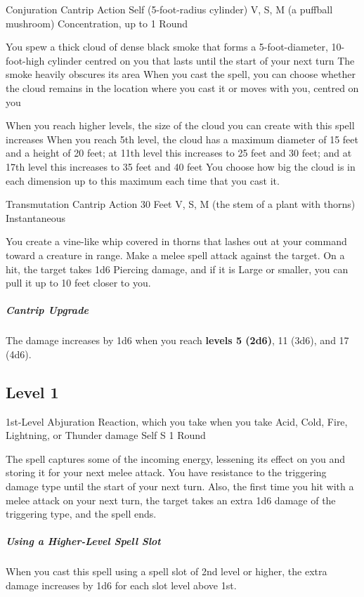 \documentclass[letterpaper,openany,oneside,twocolumn]{book}
\begin{document}
	{Conjuration Cantrip}
	{Action}
	{Self (5-foot-radius cylinder)}
	{V, S, M (a puffball mushroom)}
	{Concentration, up to 1 Round}

You spew a thick cloud of dense black smoke that forms a 5-foot-diameter, 10-foot-high cylinder centred on you that lasts until the start of your next turn The smoke heavily obscures its area When you cast the spell, you can choose whether the cloud remains in the location where you cast it or moves with you, centred on you

When you reach higher levels, the size of the cloud you can create with this spell increases When you reach 5th level, the cloud has a maximum diameter of 15 feet and a height of 20 feet; at 11th level this increases to 25 feet and 30 feet; and at 17th level this increases to 35 feet and 40 feet You choose how big the cloud is in each dimension up to this maximum each time that you cast it.

	{Transmutation Cantrip}
	{Action}
	{30 Feet}
	{V, S, M (the stem of a plant with thorns)}
	{Instantaneous}

You create a vine-like whip covered in thorns that lashes out at your command toward a creature in range. Make a melee spell attack against the target. On a hit, the target takes 1d6 Piercing damage, and if it is Large or smaller, you can pull it up to 10 feet closer to you.

\subparagraph*{Cantrip Upgrade} The damage increases by 1d6 when you reach \textbf{levels 5 (2d6)}, 11 (3d6), and 17 (4d6).

\subsection*{Level 1}

	{1st-Level Abjuration}
	{Reaction, which you take when you take Acid, Cold, Fire, Lightning, or Thunder damage}
	{Self}
	{S}
	{1 Round}

The spell captures some of the incoming energy, lessening its effect on you and storing it for your next melee attack. You have resistance to the triggering damage type until the start of your next turn. Also, the first time you hit with a melee attack on your next turn, the target takes an extra 1d6 damage of the triggering type, and the spell ends.

\subparagraph*{Using a Higher-Level Spell Slot} When you cast this spell using a spell slot of 2nd level or higher, the extra damage increases by 1d6 for each slot level above 1st.
\end{document}
